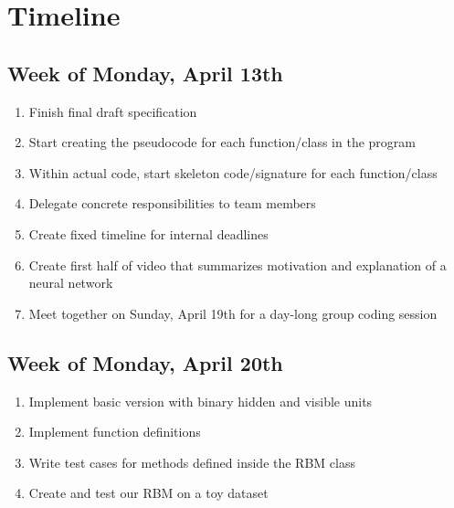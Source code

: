 \documentclass[12pt]{article}
\begin{document}
\section{Timeline}
\subsection{Week of Monday, April 13th}
\begin{enumerate}
  \item Finish final draft specification
  \item Start creating the pseudocode for each function/class in the program
  \item Within actual code, start skeleton code/signature for each function/class
  \item Delegate concrete responsibilities to team members
  \item Create fixed timeline for internal deadlines
  \item Create first half of video that summarizes motivation and explanation of a neural network
  \item Meet together on Sunday, April 19th for a day-long group coding session
\end{enumerate}

\subsection{Week of Monday, April 20th}
\begin{enumerate}
  \item Implement basic version with binary hidden and visible units
  \item Implement function definitions
  \item Write test cases for methods defined inside the RBM class
  \item Create and test our RBM on a toy dataset
\end{enumerate}
\end{document}
